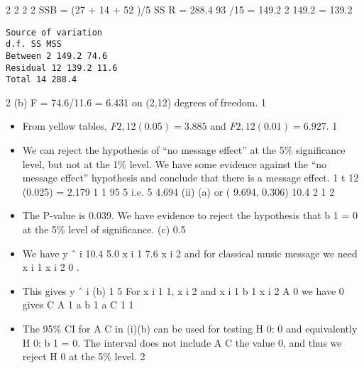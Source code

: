 \documentclass[a4paper,12pt]{article}
\begin{document}
2
2
2
2
SSB = (27 + 14 + 52 )/5
SS R = 288.4
93 /15 = 149.2
2
149.2 = 139.2
\begin{verbatim}
Source of variation
d.f. SS MSS
Between 2 149.2 74.6
Residual 12 139.2 11.6
Total 14 288.4
\end{verbatim}
2
(b)
F = 74.6/11.6 = 6.431 on (2,12) degrees of freedom. 1
\begin{itemize}
\item From yellow tables, $F 2,12 (0.05) = 3.885$ and $F 2,12 (0.01) = 6.927$. 1
\item We can reject the hypothesis of “no message effect” at the 5\% significance level, but not at the 1\% level. We have some evidence
against the “no message effect” hypothesis and conclude that there is a message effect. 1
t 12 (0.025) = 2.179 1
1
95%
5
i.e. 5 4.694
(ii)
(a)
or ( 9.694, 0.306)
10.4
2
1
2
\item The P-value is 0.039. We have evidence to reject the hypothesis that
b 1 = 0 at the 5\% level of significance.
(c)
0.5
\item We have y ˆ i 10.4 5.0 x i 1 7.6 x i 2 and for classical music
message we need x i 1 x i 2 0 .
\item This gives y ˆ i
(b)
1
5
For x i 1 1, x i 2
and x i 1
b 1
x i 2
A
0 we have
0 gives
C
A
1
a b 1
a
C
1
1
\item The 95\% CI for A C in (i)(b) can be used for testing H 0:
0 and equivalently H 0: b 1 = 0. The interval does not include
A
C
the value 0, and thus we reject H 0 at the 5\% level.
2
\end{itemize}
\end{document}
